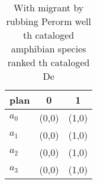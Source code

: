\documentclass[a4paper]{article}
\begin{document}
\begin{table}
\begin{adjustbox}{width=0.7\columnwidth}
\begin{tabular}{|l|l|l|}
\hline
\textbf{plan} & \multicolumn{1}{c|}{\textbf{0}} & \multicolumn{1}{c|}{\textbf{1}} \\ \hline
\textbf{$a_0$}  & (0,0) & (1,0) \\ \hline
\textbf{$a_1$}  & (0,0) & (1,0) \\ \hline
\textbf{$a_2$}  & (0,0) & (1,0) \\ \hline
\textbf{$a_3$}  & (0,0) & (1,0) \\ \hline
\end{tabular}
\end{adjustbox}
\caption{With migrant by rubbing Perorm well th cataloged amphibian species ranked th cataloged De
}
\end{table}
\end{document}
